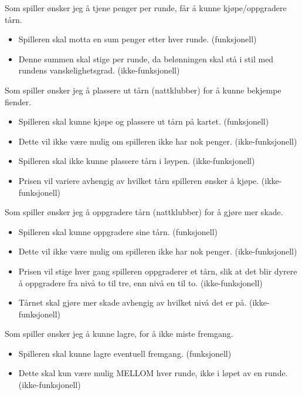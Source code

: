 \documentclass[norsk,a4paper,12 pt]{article}
\begin{document}
Som spiller ønsker jeg å tjene penger per runde, får å kunne 
kjøpe/oppgradere tårn.
\begin{itemize}
\item Spilleren skal motta en sum penger etter hver runde. (funksjonell)
    
\item Denne summen skal stige per runde, da belønningen skal stå i stil med rundens vanskelighetsgrad. (ikke-funksjonell)
\end{itemize}
Som spiller ønsker jeg å plassere ut tårn (nattklubber) for å kunne bekjempe fiender.
\begin{itemize}
\item Spilleren skal kunne kjøpe og plassere ut tårn på kartet. (funksjonell)

\item Dette vil ikke være mulig om spilleren ikke har nok penger. (ikke-funksjonell)

\item Spilleren skal ikke kunne plassere tårn i løypen. (ikke-funksjonell)

\item Prisen vil variere avhengig av hvilket tårn spilleren ønsker å kjøpe. (ikke-funksjonell)
\end{itemize}
Som spiller ønsker jeg å oppgradere tårn (nattklubber) for å gjøre mer skade.
\begin{itemize}
\item Spilleren skal kunne oppgradere sine tårn. (funksjonell)
\item Dette vil ikke være mulig om spilleren ikke har nok penger. (ikke-funksjonell)
\item Prisen vil stige hver gang spilleren oppgraderer et tårn, slik at det blir 
dyrere å oppgradere fra nivå to til tre, enn nivå en til to. (ikke-funksjonell)
\item Tårnet skal gjøre mer skade avhengig av hvilket nivå det er på. (ikke-funksjonell)
\end{itemize}
Som spiller ønsker jeg å kunne lagre, for å ikke miste fremgang. 
\begin{itemize}
\item Spilleren skal kunne lagre eventuell fremgang. (funksjonell)
\item Dette skal kun være mulig MELLOM hver runde, ikke i løpet av en runde. (ikke-funksjonell)
\end{itemize}
\end{document}
